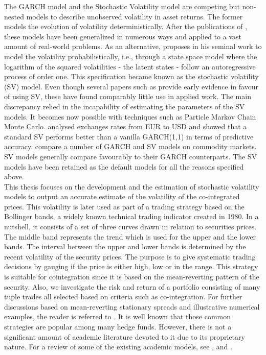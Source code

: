 \documentclass[11pt,a4,twosided,singlespacing,titlepagenumber=on]{scrreprt}
\numberwithin{equation}{chapter} %
\theoremstyle{remark}
\begin{document}

The GARCH model and the Stochastic Volatility model are competing but non-nested models to describe unobserved volatility in asset returns. The former models the evolution of volatility deterministically. After the publications of \cite{engle1986}, these models have been generalized in numerous ways and applied to a vast amount of real-world problems. As an alternative, \cite{taylor1982} proposes in his seminal work to model the volatility probabilistically, i.e., through a state space model where the logarithm of the squared volatilities - the latent states - follow an autoregressive process of order one. This specification became known as the stochastic volatility (SV) model. Even though several papers such as \cite{kim1998} provide early evidence in favour of using SV, these have found comparably little use in applied work. The main discrepancy relied in the incapability of estimating the parameters of the SV models. It becomes now possible with techniques such as Particle Markov Chain Monte Carlo. \cite{kastner2014} analysed exchanges rates from EUR to USD and showed that a standard SV performs better than a vanilla GARCH(1,1) in terms of predictive accuracy. \cite{chan2015} compare a number of GARCH and SV models on commodity markets. SV models generally compare favourably to their GARCH counterparts. The SV models have been retained as the default models for all the reasons specified above. \\


This thesis focuses on the development and the estimation of stochastic volatility models to output an accurate estimate of the volatility of the co-integrated prices. This volatility is later used as part of a trading strategy based on the Bollinger bands, a widely known technical trading indicator created in 1980. In a nutshell, it consists of a set of three curves drawn in relation to securities prices. The middle band represents the trend which is used for the upper and the lower bands. The interval between the upper and lower bands is determined by the recent volatility of the security prices. The purpose is to give systematic trading decisions by gauging if the price is either high, low or in the range. This strategy is suitable for cointegration since it is based on the mean-reverting pattern of the security. Also, we investigate the risk and return of a portfolio consisting of many tuple trades all selected based on criteria such as co-integration. For further discussions based on mean-reverting stationary spreads and illustrative numerical examples, the reader is referred to \cite{vidyamurthy2004}.  It is well known that those common strategies are popular among many hedge funds. However, there is not a significant amount of academic literature devoted to it due to its proprietary nature. For a review of some of the existing academic models, see \cite{gatev2006}, \cite{perlin2009} and \cite{broussard2012}. \\
\end{document}
